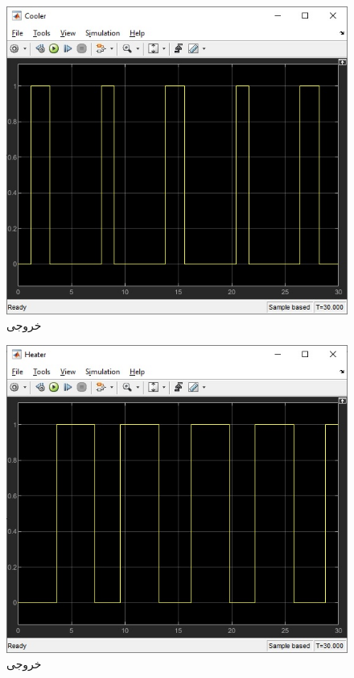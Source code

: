 \documentclass[]{article}
\begin{document}
\begin{figure}[H]
    \centering
    \includegraphics[scale=0.6]{pics/cooler.jpg}
    \caption{خروجی }
\end{figure}
\begin{figure}[H]
    \centering
    \includegraphics[scale=0.6]{pics/heater.jpg}
    \caption{خروجی }
\end{figure}
\end{document}
